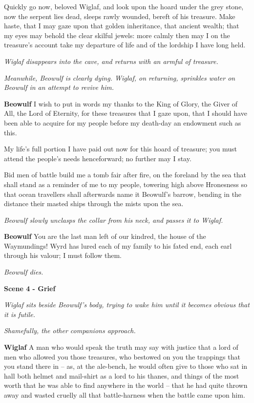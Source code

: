 \documentclass[a4paper]{article}
\begin{document}
{Quickly go now,
beloved Wiglaf, and look upon the hoard
under the grey stone, now the serpent lies dead,
sleeps rawly wounded, bereft of his treasure.
Make haste, that I may gaze upon that golden inheritance,
that ancient wealth; that my eyes may behold
the clear skilful jewels: more calmly then may I
on the treasure’s account take my departure
of life and of the lordship I have long held.

\centerline{\textit{Wiglaf disappears into the cave, and returns with an armful of treasure.}}
\centerline{\textit{Meanwhile, Beowulf is clearly dying. Wiglaf, on returning, sprinkles water on Beowulf in an attempt to revive him.}}

\textbf{Beowulf} I wish to put in words my thanks
to the King of Glory, the Giver of All,
the Lord of Eternity, for these treasures that I gaze upon,
that I should have been able to acquire for my people
before my death-day an endowment such as this.

My life’s full portion I have paid out now
for this hoard of treasure; you must attend the people’s
needs henceforward; no further may I stay.

Bid men of battle build me a tomb
fair after fire, on the foreland by the sea
that shall stand as a reminder of me to my people,
towering high above Hronesness
so that ocean travellers shall afterwards name it
Beowulf’s barrow, bending in the distance
their masted ships through the mists upon the sea.

\centerline{\textit{Beowulf slowly unclasps the collar from his neck, and passes it to Wiglaf.}}

\textbf{Beowulf} You are the last man left of our kindred,
the house of the Waymundings! Wyrd has lured
each of my family to his fated end,
each earl through his valour; I must follow them.

\centerline{\textit{Beowulf dies.}}

\centerline{\textbf{Scene 4 - Grief}}
\centerline{\textit{Wiglaf sits beside Beowulf's body, trying to wake him until it becomes obvious that it is futile.}}
\centerline{\textit{Shamefully, the other companions approach.}}

\textbf{Wiglaf} A man who would speak the truth may say with justice
that a lord of men who allowed you those treasures,
who bestowed on you the trappings that you stand there in
– as, at the ale-bench, he would often give
to those who sat in hall both helmet and
mail-shirt
as a lord to his thanes, and things of the most worth
that he was able to find anywhere in the world –
that he had quite thrown away and wasted cruelly
all that battle-harness when the battle came upon him.

}
\end{document}
